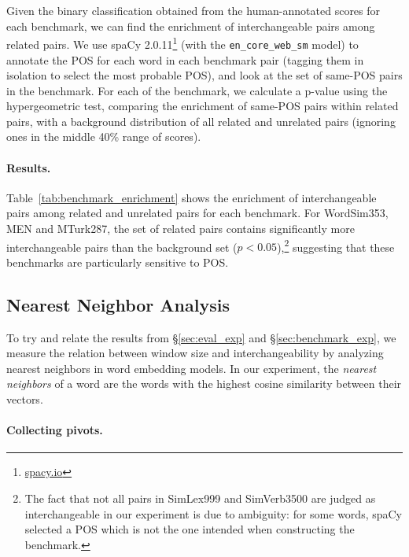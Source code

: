 \documentclass[11pt,a4paper]{article}
\begin{document}
    Given the binary classification obtained from the human-annotated scores
    for each benchmark, we can find the enrichment of interchangeable pairs among
    related pairs.
    We use spaCy 2.0.11\footnote{\url{spacy.io}} (with the \texttt{en\_core\_web\_sm} model)
    to annotate the POS for each word in each benchmark
    pair (tagging them in isolation to select the most probable POS),
    and look at the set of same-POS pairs in the benchmark.
    For each of the benchmark, we calculate a p-value using the hypergeometric
    test, comparing the enrichment of same-POS pairs within related pairs,
    with a background distribution of all related and unrelated pairs (ignoring ones in
    the middle 40\% range of scores).
    
    \paragraph{Results.}
    
    Table~\ref{tab:benchmark_enrichment} shows the enrichment of interchangeable pairs
    among related and unrelated pairs for each benchmark.
    For WordSim353, MEN and MTurk287, the set of related pairs
    contains significantly more interchangeable pairs than the background
    set ($p<0.05$),\footnote{The fact that not all pairs in SimLex999 and SimVerb3500
    are judged as interchangeable
    in our experiment is due to ambiguity: for some words, spaCy selected a POS
    which is not the one intended when constructing the benchmark.}
    suggesting that these benchmarks are particularly sensitive to POS.
    
    
    \subsection{Nearest Neighbor Analysis}\label{sec:interchangeability_exp}
    
    To try and relate the results from \S\ref{sec:eval_exp} and \S\ref{sec:benchmark_exp},
    we measure the relation between window size and interchangeability
    by analyzing nearest neighbors in word embedding models.
    In our experiment, the \textit{nearest neighbors} of a word are the words
    with the highest cosine similarity between their vectors.
        
    \paragraph{Collecting pivots.}
    
\end{document}
